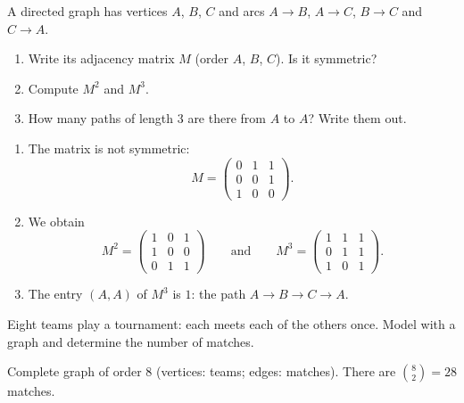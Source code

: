 \begin{exercise}
A directed graph has vertices $A$, $B$, $C$ and arcs $A\to B$, $A\to C$, $B\to C$ and $C\to A$.
\begin{enumerate}
\item Write its adjacency matrix $M$ (order $A$, $B$, $C$). Is it symmetric?
\item Compute $M^2$ and $M^3$.
\item How many paths of length $3$ are there from $A$ to $A$? Write them out.
\end{enumerate}
\end{exercise}
\begin{solution}
\begin{enumerate}
\item The matrix is not symmetric: \[M=\begin{pmatrix}0&1&1\\0&0&1\\1&0&0\end{pmatrix}.\]
\item We obtain \[M^2=\begin{pmatrix}1&0&1\\1&0&0\\0&1&1\end{pmatrix}\qquad\text{and}\qquad M^3=\begin{pmatrix}1&1&1\\0&1&1\\1&0&1\end{pmatrix}.\]
\item The entry $(A,A)$ of $M^3$ is $1$: the path $A\to B\to C\to A$.
\end{enumerate}
\end{solution}

\begin{exercise}[A tournament]
Eight teams play a tournament: each meets each of the others once. Model with a graph and determine the number of matches.
\end{exercise}
\begin{solution}
Complete graph of order $8$ (vertices: teams; edges: matches). There are $\binom82=28$ matches.
\end{solution}

